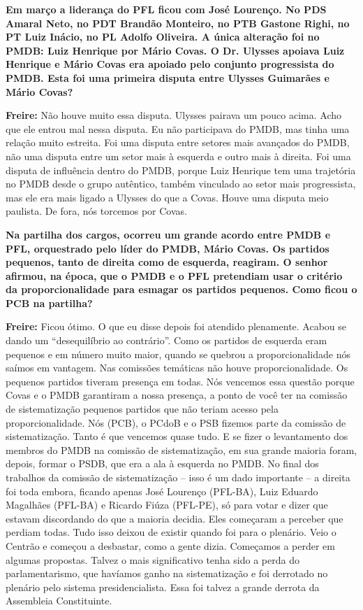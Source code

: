 \textbf{Em março a liderança do PFL ficou com José Lourenço. No PDS
Amaral Neto, no PDT Brandão Monteiro, no PTB Gastone Righi, no PT Luiz
Inácio, no PL Adolfo Oliveira. A única alteração foi no PMDB: Luiz
Henrique por Mário Covas. O Dr. Ulysses apoiava Luiz Henrique e Mário
Covas era apoiado pelo conjunto progressista do PMDB. Esta foi uma
primeira disputa entre Ulysses Guimarães e Mário Covas?}

\textbf{Freire:} Não houve muito essa disputa. Ulysses pairava um pouco
acima. Acho que ele entrou mal nessa disputa. Eu não participava do
PMDB, mas tinha uma relação muito estreita. Foi uma disputa entre
setores mais avançados do PMDB, não uma disputa entre um setor mais à
esquerda e outro mais à direita. Foi uma disputa de influência dentro do
PMDB, porque Luiz Henrique tem uma trajetória no PMDB desde o grupo
autêntico, também vinculado ao setor mais progressista, mas ele era mais
ligado a Ulysses do que a Covas. Houve uma disputa meio paulista. De
fora, nós torcemos por Covas.

\textbf{Na partilha dos cargos, ocorreu um grande acordo entre PMDB e
PFL, orquestrado pelo líder do PMDB, Mário Covas. Os partidos pequenos,
tanto de direita como de esquerda, reagiram. O senhor afirmou, na época,
que o PMDB e o PFL pretendiam usar o critério da proporcionalidade para
esmagar os partidos pequenos. Como ficou o PCB na partilha?}

\textbf{Freire:} Ficou ótimo. O que eu disse depois foi atendido
plenamente. Acabou se dando um ``desequilíbrio ao contrário''. Como os
partidos de esquerda eram pequenos e em número muito maior, quando se
quebrou a proporcionalidade nós saímos em vantagem. Nas comissões
temáticas não houve proporcionalidade. Os pequenos partidos tiveram
presença em todas. Nós vencemos essa questão porque Covas e o PMDB
garantiram a nossa presença, a ponto de você ter na comissão de
sistematização pequenos partidos que não teriam acesso pela
proporcionalidade. Nós (PCB), o PCdoB e o PSB fizemos parte da comissão
de sistematização. Tanto é que vencemos quase tudo. E se fizer o
levantamento dos membros do PMDB na comissão de sistematização, em sua
grande maioria foram, depois, formar o PSDB, que era a ala à esquerda no
PMDB. No final dos trabalhos da comissão de sistematização -- isso é um
dado importante -- a direita foi toda embora, ficando apenas José
Lourenço (PFL-BA), Luiz Eduardo Magalhães (PFL-BA) e Ricardo Fiúza
(PFL-PE), só para votar e dizer que estavam discordando do que a maioria
decidia. Eles começaram a perceber que perdiam todas. Tudo isso deixou
de existir quando foi para o plenário. Veio o Centrão e começou a
desbastar, como a gente dizia. Começamos a perder em algumas propostas.
Talvez o mais significativo tenha sido a perda do parlamentarismo, que
havíamos ganho na sistematização e foi derrotado no plenário pelo
sistema presidencialista. Essa foi talvez a grande derrota da Assembleia
Constituinte.

